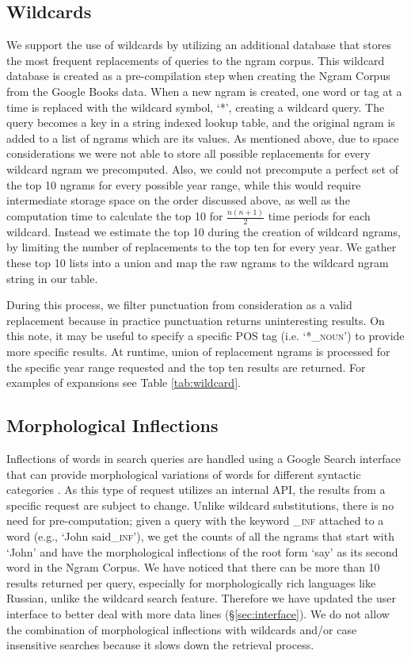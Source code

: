 \documentclass[11pt]{article}
\begin{document}
\subsection{Wildcards}
\label{sec:wildcards}
	We support the use of wildcards by utilizing an additional database that stores the most frequent replacements of queries to the ngram corpus. This wildcard database is created as a pre-compilation step when creating the Ngram Corpus from the Google Books data. When a new ngram is created, one word or tag at a time is replaced with the wildcard symbol, `*', creating a wildcard query. The query becomes a key in a string indexed lookup table, and the original ngram is added to a list of ngrams which are its values. As mentioned above, due to space considerations we were not able to store all possible replacements for every wildcard ngram we precomputed. Also, we could not precompute a perfect set of the top 10 ngrams for every possible year range, while this would require intermediate storage space on the order discussed above, as well as the computation time to calculate the top 10 for $\frac{n(n+1)}{2}$ time periods for each wildcard. Instead we estimate the top 10 during the creation of wildcard ngrams, by limiting the number of replacements to the top ten for every year. We gather these top 10 lists into a union and map the raw ngrams to the wildcard ngram string in our table. 
	
	During this process, we filter punctuation from consideration as a valid replacement because in practice punctuation returns uninteresting results. On this note, it may be useful to specify a specific POS tag (i.e. `*\textsf{\textsc{\_noun}}') to provide more specific results. At runtime, union of replacement ngrams is processed for the specific year range requested and the top ten results are returned. For examples of expansions see Table \ref{tab:wildcard}. 


\subsection{Morphological Inflections}
Inflections of words in search queries are handled using a Google Search interface that can provide morphological variations of words for different syntactic categories \cite{durrett2013supervised}. As this type of request utilizes an internal API, the results from a specific request are subject to change. Unlike wildcard substitutions, there is no need for pre-computation; given a query with the keyword \textsf{\textsc{\_inf}} attached to a word (e.g., `John said\textsf{\textsc{\_inf}}'), we get the counts of all the ngrams that start with `John' and have the morphological inflections of the root form `say' as its second word in the Ngram Corpus. We have noticed that there can be more than 10 results returned per query, especially for morphologically rich languages like Russian, unlike the wildcard search feature. Therefore we have updated the user interface to better deal with more data lines (\S\ref{sec:interface}). We do not allow the combination of morphological inflections with wildcards and/or case insensitive searches
because it slows down the retrieval process.
\end{document}
